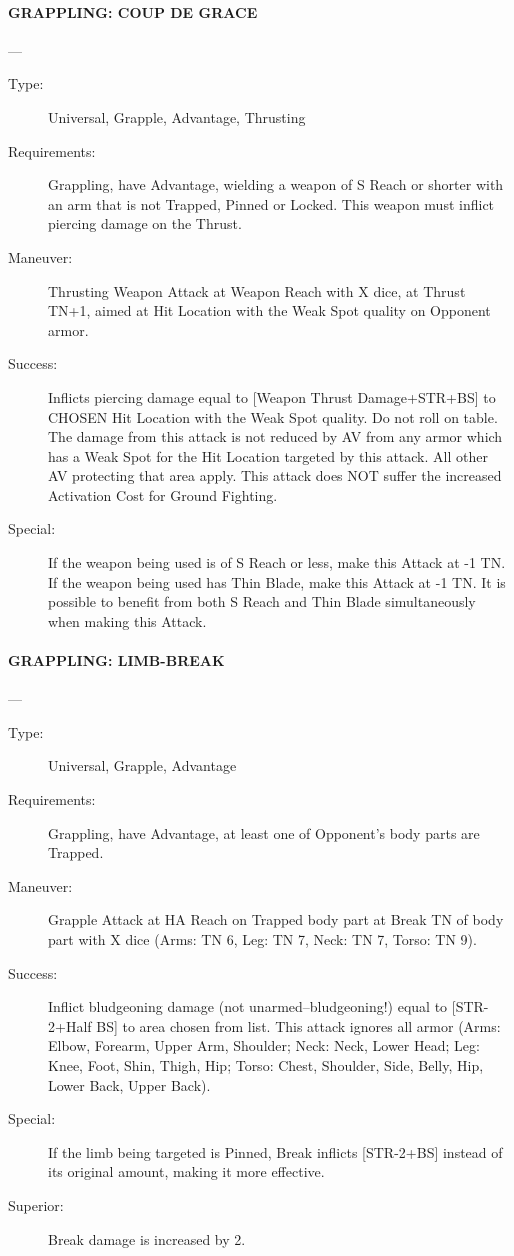 \documentclass[oneside,11pt,english]{book}
\begin{document}
\paragraph{\large\label{man:GRAPPLING: COUP DE GRACE} GRAPPLING: COUP DE GRACE}---\quad{\large[X+2]}
\vspace{-10pt}\begin{description} 
\item [Type:] Universal, Grapple, Advantage, Thrusting 
\item [Requirements:] Grappling, have Advantage, wielding a weapon of S Reach or shorter with an arm that is 
not Trapped, Pinned or Locked. This weapon must inflict piercing damage on the Thrust. 
\item [Maneuver:] Thrusting Weapon Attack at Weapon Reach with X dice, at Thrust TN+1, aimed at Hit 
Location with the Weak Spot quality on Opponent armor. 
\item [Success:] Inflicts piercing damage equal to [Weapon Thrust Damage+STR+BS] to CHOSEN Hit Location 
with the Weak Spot quality. Do not roll on table. The damage from this attack is not reduced by AV from 
any armor which has a Weak Spot for the Hit Location targeted by this attack. All other AV protecting 
that area apply. 
This attack does NOT suffer the increased Activation Cost for Ground Fighting. 
\item [Special:] If the weapon being used is of S Reach or less, make this Attack at -1 TN. If the weapon being 
used has Thin Blade, make this Attack at -1 TN. It is possible to benefit from both S Reach and Thin 
Blade simultaneously when making this Attack. 
\end{description}
\paragraph{\large\label{man:GRAPPLING: LIMB-BREAK} GRAPPLING: LIMB-BREAK}---\quad{\large[X]}
\vspace{-10pt}\begin{description} 
\item [Type:] Universal, Grapple, Advantage 
\item [Requirements:] Grappling, have Advantage, at least one of Opponent's body parts are Trapped. 
\item [Maneuver:] Grapple Attack at HA Reach on Trapped body part at Break TN of body part with X dice 
(Arms: TN 6, Leg: TN 7, Neck: TN 7, Torso: TN 9). 
\item [Success:] Inflict bludgeoning damage (not unarmed--bludgeoning!) equal to [STR-2+Half BS] to area 
chosen from list. This attack ignores all armor (Arms: Elbow, Forearm, Upper Arm, Shoulder; Neck: 
Neck, Lower Head; Leg: Knee, Foot, Shin, Thigh, Hip; Torso: Chest, Shoulder, Side, Belly, Hip, Lower 
Back, Upper Back). 
\item [Special:] If the limb being targeted is Pinned, Break inflicts [STR-2+BS] instead of its original amount, 
making it more effective. 
\item [Superior:] Break damage is increased by 2. 
\end{description}
\end{document}
